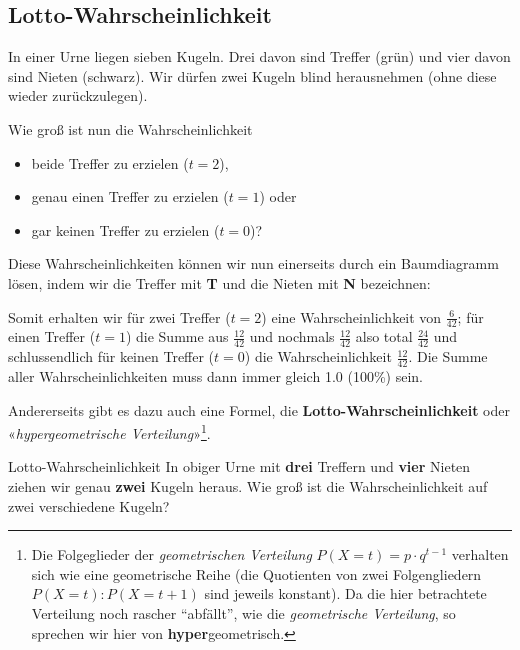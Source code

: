 
\newpage

\subsection{Lotto-Wahrscheinlichkeit}
In einer Urne liegen sieben Kugeln. Drei davon sind Treffer (grün) und vier davon sind Nieten (schwarz).
Wir dürfen zwei Kugeln blind herausnehmen (ohne diese wieder zurückzulegen).


Wie groß ist nun die Wahrscheinlichkeit
\begin{itemize}
\item beide Treffer zu erzielen ($t=2$),
\item genau einen Treffer zu erzielen ($t=1$) oder
\item gar keinen Treffer zu erzielen ($t=0$)?
\end{itemize}

Diese Wahrscheinlichkeiten können wir nun einerseits durch ein Baumdiagramm lösen, indem wir die Treffer mit \textbf{\color{ForestGreen}T} und die Nieten mit \textbf{\color{red}N} bezeichnen:


Somit erhalten wir für zwei Treffer ($t=2$) eine Wahrscheinlichkeit von $\frac{6}{42}$; für einen Treffer ($t=1$) die Summe aus $\frac{12}{42}$ und nochmals $\frac{12}{42}$ also total $\frac{24}{42}$ und schlussendlich für keinen Treffer ($t=0$) die Wahrscheinlichkeit $\frac{12}{42}$.
Die Summe aller Wahrscheinlichkeiten muss dann immer gleich 1.0 (100\%) sein.
\newpage

Andererseits gibt es dazu auch eine Formel, die
\textbf{Lotto-Wahrscheinlichkeit} oder «\textit{hypergeometrische
  Verteilung}»\footnote{Die Folgeglieder der \textit{geometrischen
    Verteilung} $P(X=t) = p\cdot{}q^{t-1}$ verhalten sich wie eine
  geometrische Reihe (die Quotienten von zwei Folgengliedern $P(X=t) :
  P(X=t+1)$ sind jeweils konstant). Da die hier betrachtete Verteilung
  noch rascher ``abfällt'', wie die \textit{geometrische Verteilung},
  so sprechen wir hier von \textbf{hyper}geometrisch.}.

\begin{beispiel}{Lotto-Wahrscheinlichkeit}{}
  In obiger Urne mit \textbf{drei} Treffern und \textbf{vier} Nieten
  ziehen wir genau \textbf{zwei} Kugeln heraus. Wie groß ist die
  Wahrscheinlichkeit auf zwei verschiedene Kugeln?
\end{beispiel}



